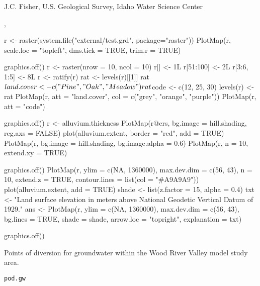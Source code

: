 \documentclass[letterpaper]{book}
\begin{document}
%
\begin{Author}\relax
J.C. Fisher, U.S. Geological Survey, Idaho Water Science Center
\end{Author}
%
\begin{SeeAlso}\relax
{}, 
\end{SeeAlso}
%
\begin{Examples}
\begin{ExampleCode}
r <- raster(system.file("external/test.grd", package="raster"))
PlotMap(r, scale.loc = "topleft", dms.tick = TRUE, trim.r = TRUE)

graphics.off()
r <- raster(nrow = 10, ncol = 10)
r[] <- 1L
r[51:100] <- 2L
r[3:6, 1:5] <- 8L
r <- ratify(r)
rat <- levels(r)[[1]]
rat$land.cover <- c("Pine", "Oak", "Meadow")
rat$code <- c(12, 25, 30)
levels(r) <- rat
PlotMap(r, att = "land.cover", col = c("grey", "orange", "purple"))
PlotMap(r, att = "code")

graphics.off()
r <- alluvium.thickness
PlotMap(r@crs, bg.image = hill.shading, reg.axs = FALSE)
plot(alluvium.extent, border = "red", add = TRUE)
PlotMap(r, bg.image = hill.shading, bg.image.alpha = 0.6)
PlotMap(r, n = 10, extend.xy = TRUE)

graphics.off()
PlotMap(r, ylim = c(NA, 1360000), max.dev.dim = c(56, 43), n = 10, extend.z = TRUE,
        contour.lines = list(col = "#A9A9A9"))
plot(alluvium.extent, add = TRUE)
shade <- list(z.factor = 15, alpha = 0.4)
txt <- "Land surface elevation in meters above National Geodetic Vertical Datum of 1929."
ans <- PlotMap(r, ylim = c(NA, 1360000), max.dev.dim = c(56, 43), bg.lines = TRUE,
               shade = shade, arrow.loc = "topright", explanation = txt)

graphics.off()
\end{ExampleCode}
\end{Examples}
%
\begin{Description}\relax
Points of diversion for groundwater within the Wood River Valley model study area.
\end{Description}
%
\begin{Usage}
\begin{verbatim}
pod.gw
\end{verbatim}
\end{Usage}
%
\end{document}
